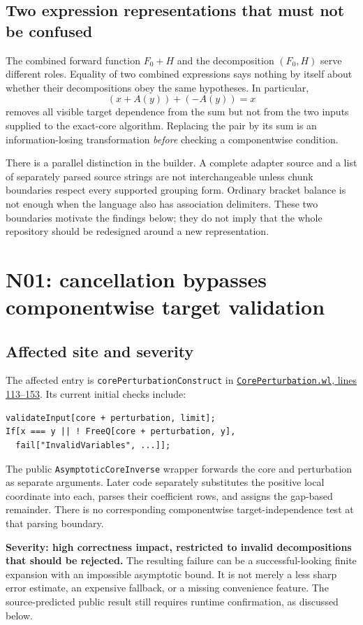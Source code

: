 \documentclass[11pt,letterpaper]{article}
\newcommand{\code}[1]{\nolinkurl{#1}}
\newcommand{\src}[2]{\href{https://github.com/VladimirReshetnikov/Asymptotic/blob/efa1aeec4845a9c35e140963a0333d0c9ec33b05/#1}{#2}}
\begin{document}
\subsection{Two expression representations that must not be confused}
The combined forward function \(F_0+H\) and the decomposition \((F_0,H)\) serve different roles. Equality of two combined expressions says nothing by itself about whether their decompositions obey the same hypotheses. In particular,
\[
 (x+A(y))+(-A(y))=x
\]
removes all visible target dependence from the sum but not from the two inputs supplied to the exact-core algorithm. Replacing the pair by its sum is an information-losing transformation \emph{before} checking a componentwise condition.

There is a parallel distinction in the builder. A complete adapter source and a list of separately parsed source strings are not interchangeable unless chunk boundaries respect every supported grouping form. Ordinary bracket balance is not enough when the language also has association delimiters. These two boundaries motivate the findings below; they do not imply that the whole repository should be redesigned around a new representation.

\section{N01: cancellation bypasses componentwise target validation}
\label{sec:n01}

\subsection{Affected site and severity}
The affected entry is \code{corePerturbationConstruct} in
\src{src/Kernel/CorePerturbation.wl\#L113-L153}{\code{CorePerturbation.wl}, lines 113--153}. Its current initial checks include:
\begin{lstlisting}
validateInput[core + perturbation, limit];
If[x === y || ! FreeQ[core + perturbation, y],
  fail["InvalidVariables", ...]];
\end{lstlisting}
The public \code{AsymptoticCoreInverse} wrapper forwards the core and perturbation as separate arguments. Later code separately substitutes the positive local coordinate into each, parses their coefficient rows, and assigns the gap-based remainder. There is no corresponding componentwise target-independence test at that parsing boundary.\cite{core}

\textbf{Severity: high correctness impact, restricted to invalid decompositions that should be rejected.} The resulting failure can be a successful-looking finite expansion with an impossible asymptotic bound. It is not merely a less sharp error estimate, an expensive fallback, or a missing convenience feature. The source-predicted public result still requires runtime confirmation, as discussed below.
\end{document}
